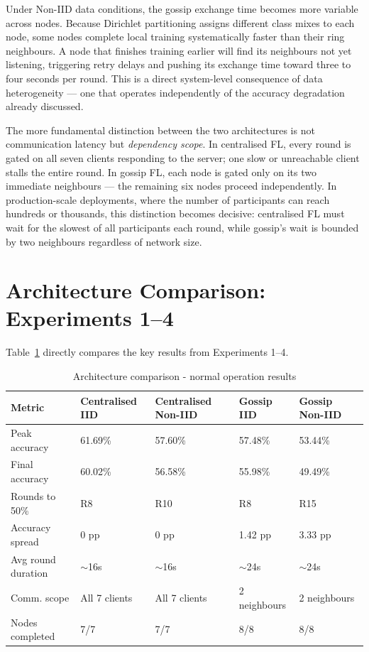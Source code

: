 \documentclass[12pt]{report}
\begin{document}
Under Non-IID data conditions, the gossip exchange time becomes more variable
across nodes. Because Dirichlet partitioning assigns different class mixes to
each node, some nodes complete local training systematically faster than their
ring neighbours. A node that finishes training earlier will find its neighbours
not yet listening, triggering retry delays and pushing its exchange time toward
three to four seconds per round. This is a direct system-level consequence of
data heterogeneity --- one that operates independently of the accuracy
degradation already discussed.

The more fundamental distinction between the two architectures is not
communication latency but \emph{dependency scope}. In centralised FL, every
round is gated on all seven clients responding to the server; one slow or
unreachable client stalls the entire round. In gossip FL, each node is gated
only on its two immediate neighbours --- the remaining six nodes proceed
independently. In production-scale deployments, where the number of
participants can reach hundreds or thousands, this distinction becomes
decisive: centralised FL must wait for the slowest of all participants each
round, while gossip's wait is bounded by two neighbours regardless of network
size.

\section{Architecture Comparison: Experiments 1--4}
\label{sec:architecture-comparison}

Table~\ref{tab:arch-comparison} directly compares the key results from
Experiments 1--4.

\begin{table}[H]
\centering
\small
\begin{tabular}{lp{2cm}p{2.2cm}p{1.9cm}p{2.2cm}}
\toprule
\textbf{Metric}
  & \textbf{Centralised IID}
  & \textbf{Centralised Non-IID}
  & \textbf{Gossip IID}
  & \textbf{Gossip Non-IID} \\
\midrule
Peak accuracy    & 61.69\% & 57.60\% & 57.48\% & 53.44\% \\
Final accuracy   & 60.02\% & 56.58\% & 55.98\% & 49.49\% \\
Rounds to 50\%   & R8      & R10     & R8      & R15     \\
Accuracy spread  & 0 pp    & 0 pp    & 1.42 pp & 3.33 pp \\
Avg round duration & $\sim$16s & $\sim$16s & $\sim$24s & $\sim$24s \\
Comm. scope      & All 7 clients & All 7 clients & 2 neighbours & 2 neighbours \\
Nodes completed  & 7/7     & 7/7     & 8/8     & 8/8     \\
\bottomrule
\end{tabular}
\vspace{0.5cm}
\caption{Architecture comparison - normal operation results}
\label{tab:arch-comparison}
\end{table}
\end{document}
